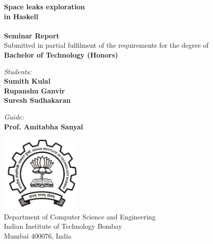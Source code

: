 \begin{titlepage}
\begin{center}

{\Huge \bfseries
Space leaks exploration \\
in Haskell\\
}~\\[1cm]


{\large \bfseries
Seminar Report
}~\\[0.40cm]

{
Submitted in partial fulfilment of the requirements for the degree of
}~\\[0.20cm]

{\large \bfseries
Bachelor of Technology (Honors)
}\\[2.75cm]
\end{center}

\begin{multicols}{2}
\begin{flushleft}
{\large
\textit{Students:} \\
\textbf{Sumith Kulal} \\
\textbf{Rupanshu Ganvir} \\
\textbf{Suresh Sudhakaran} \\
}
\end{flushleft}
\columnbreak
\begin{flushright}
{\large
\textit{Guide:} \\
\textbf{Prof. Amitabha Sanyal}
}
\end{flushright}
\end{multicols}

\vfill

\begin{center}
\includegraphics[width=4cm]{Figures/iitbblack.jpg}~\\[1cm]

{\large
Department of Computer Science and Engineering\\
Indian Institute of Technology Bombay\\
Mumbai 400076, India\\
}

\end{center}
\end{titlepage}